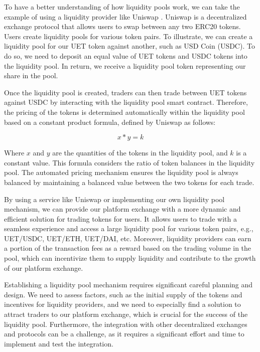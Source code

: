 To have a better understanding of how liquidity pools work, we can take the example of using a liquidity provider
like Uniswap \cite{uniswap}. Uniswap is a decentralized exchange protocol that allows users to swap between any two
ERC20 tokens. Users create liquidity pools for various token pairs. To illustrate, we can create a liquidity pool for
our UET token against another, such as USD Coin (USDC). To do so, we need to deposit an equal value of UET tokens and
USDC tokens into the liquidity pool. In return, we receive a liquidity pool token representing our share in the
pool.


Once the liquidity pool is created, traders can then trade between UET tokens against USDC by interacting with the
liquidity pool smart contract. Therefore, the pricing of the tokens is determined automatically within the liquidity pool
based on a constant product formula, defined by Uniswap \cite{uniswap_formula} as follows: 

\begin{equation}
    x * y = k
\end{equation}

Where $x$ and $y$ are the quantities of the tokens in the liquidity pool, and $k$ is a constant value. This formula considers the ratio of token balances in the liquidity pool. The automated pricing mechanism ensures the liquidity pool is always balanced by maintaining a balanced value between the two tokens for each trade.

By using a service like Uniswap or implementing our own liquidity pool mechanism, we can provide our platform
exchange with a more dynamic and efficient solution for trading tokens for users. It allows users to trade with a seamless
experience and access a large liquidity pool for various token pairs, e.g., UET/USDC, UET/ETH, UET/DAI, etc. Moreover,
liquidity providers can earn a portion of the transaction fees as a reward based on the trading volume in the pool,
which can incentivize them to supply liquidity and contribute to the growth of our platform exchange.

Establishing a liquidity pool mechanism requires significant careful planning and design. We need to assess
factors, such as the initial supply of the tokens and incentives for liquidity providers, and we need to especially find
a solution to attract traders to our platform exchange, which is crucial for the success of the liquidity pool.
Furthermore, the integration with other decentralized exchanges and protocols can be a challenge, as it requires
a significant effort and time to implement and test the integration.